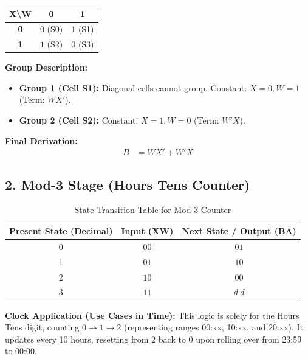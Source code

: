 \documentclass[journal,12pt,onecolumn]{IEEEtran}
\begin{document}
		\begin{table}[H]
			\centering
			\begin{tabular}{|c|c|c|}
				\hline
				\textbf{X\textbackslash W} & \textbf{0} & \textbf{1} \\
				\hline
				\textbf{0} & $0$ (S0) & \cellcolor{grpRed}$1$ (S1) \\
				\hline
				\textbf{1} & \cellcolor{grpGreen}$1$ (S2) & $0$ (S3) \\
				\hline
			\end{tabular}
		\end{table}
		
		\begin{justify}
			\textbf{Group Description:}
			\begin{itemize}
				\item \textbf{Group 1 (Cell S1):} Diagonal cells cannot group. Constant: $X=0, W=1$ (Term: $WX'$).
				\item \textbf{Group 2 (Cell S2):} Constant: $X=1, W=0$ (Term: $W'X$).
			\end{itemize}
			
			\textbf{Final Derivation:}
			\begin{align}
				B &= WX' + W'X
			\end{align}
		\end{justify}
		
		\vspace{1em}
		\subsection{2. Mod-3 Stage (Hours Tens Counter)}
		
		\begin{table}[H]
			\centering
			\begin{tabular}{|c|c|c|}
				\hline
				\textbf{Present State (Decimal)} & \textbf{Input (XW)} & \textbf{Next State / Output (BA)} \\
				\hline
				0 & $00$ & $01$ \\
				\hline
				1 & $01$ & $10$ \\
				\hline
				2 & $10$ & $00$ \\
				\hline
				3 & $11$ & $d\ d$ \\
				\hline
			\end{tabular}
			\caption{State Transition Table for Mod-3 Counter}
		\end{table}
		
		\begin{justify}
			\textbf{Clock Application (Use Cases in Time):} This logic is solely for the Hours Tens digit, counting $0 \rightarrow 1 \rightarrow 2$ (representing ranges 00:xx, 10:xx, and 20:xx). It updates every 10 hours, resetting from 2 back to 0 upon rolling over from 23:59 to 00:00.
		\end{justify}
		
\end{document}
